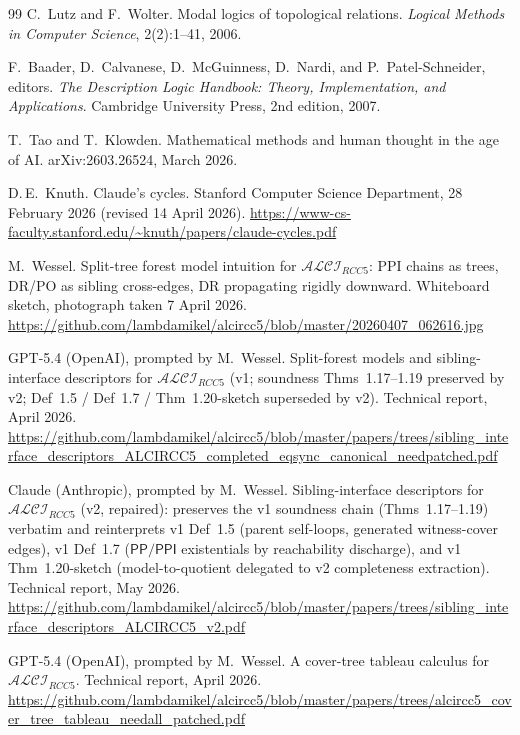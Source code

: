 \documentclass[
]{ceurart}
\theoremstyle{definition}
\newcommand{\ALCIRCC}[1]{\ensuremath{\mathcal{ALCI}_{\mathit{RCC#1}}}}
\newcommand{\PP}{\ensuremath{\mathsf{PP}}}
\newcommand{\PPI}{\ensuremath{\mathsf{PPI}}}
\begin{document}
\begin{thebibliography}{99}
C.\ Lutz and F.\ Wolter.
\newblock Modal logics of topological relations.
\newblock \emph{Logical Methods in Computer Science}, 2(2):1--41, 2006.

 F.\ Baader, D.\ Calvanese, D.\ McGuinness,
  D.\ Nardi, and P.\ Patel-Schneider, editors.  \newblock \emph{The
  Description Logic Handbook: Theory, Implementation, and
  Applications}.  \newblock Cambridge University Press, 2nd edition,
  2007.

 T.\ Tao and T.\ Klowden.  \newblock
  Mathematical methods and human thought in the age of {AI}.
  \newblock arXiv:2603.26524, March 2026.

 D.\,E.\ Knuth.  \newblock Claude's
  cycles.  \newblock Stanford Computer Science Department, 28 February
  2026 (revised 14 April 2026).  \newblock
  \url{https://www-cs-faculty.stanford.edu/~knuth/papers/claude-cycles.pdf}

 M.\ Wessel.  \newblock Split-tree
  forest model intuition for $\mathcal{ALCI}_{RCC5}$: {PPI} chains as
  trees, {DR/PO} as sibling cross-edges, {DR} propagating rigidly
  downward.  \newblock Whiteboard sketch, photograph taken 7 April
  2026.  \newblock
  \url{https://github.com/lambdamikel/alcircc5/blob/master/20260407_062616.jpg}

GPT-5.4 (OpenAI), prompted by M.\ Wessel.
\newblock Split-forest models and sibling-interface descriptors for
  $\ALCIRCC{5}$ (v1; soundness Thms~1.17--1.19 preserved by v2;
  Def~1.5 / Def~1.7 / Thm~1.20-sketch superseded by v2).
\newblock Technical report, April 2026.
\newblock \url{https://github.com/lambdamikel/alcircc5/blob/master/papers/trees/sibling_interface_descriptors_ALCIRCC5_completed_eqsync_canonical_needpatched.pdf}

Claude (Anthropic), prompted by M.\ Wessel.
\newblock Sibling-interface descriptors for $\ALCIRCC{5}$ (v2,
  repaired): preserves the v1 soundness chain
  (Thms~1.17--1.19) verbatim and reinterprets v1 Def~1.5
  (parent self-loops, generated witness-cover edges), v1 Def~1.7
  ($\PP/\PPI$ existentials by reachability discharge), and v1
  Thm~1.20-sketch (model-to-quotient delegated to v2 completeness
  extraction).
\newblock Technical report, May 2026.
\newblock \url{https://github.com/lambdamikel/alcircc5/blob/master/papers/trees/sibling_interface_descriptors_ALCIRCC5_v2.pdf}

GPT-5.4 (OpenAI), prompted by M.\ Wessel.
\newblock A cover-tree tableau calculus for $\ALCIRCC{5}$.
\newblock Technical report, April 2026.
\newblock \url{https://github.com/lambdamikel/alcircc5/blob/master/papers/trees/alcircc5_cover_tree_tableau_needall_patched.pdf}


\end{thebibliography}
\end{document}
